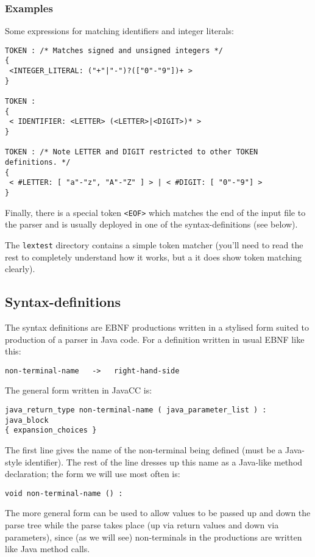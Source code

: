 \documentclass{article}
\begin{document}
\subsubsection*{Examples}

Some expressions for matching identifiers and integer literals:
\begin{verbatim}
TOKEN : /* Matches signed and unsigned integers */
{
 <INTEGER_LITERAL: ("+"|"-")?(["0"-"9"])+ > 
}

TOKEN : 
{ 
 < IDENTIFIER: <LETTER> (<LETTER>|<DIGIT>)* >
}

TOKEN : /* Note LETTER and DIGIT restricted to other TOKEN definitions. */
{
 < #LETTER: [ "a"-"z", "A"-"Z" ] > | < #DIGIT: [ "0"-"9"] >
}
\end{verbatim}
Finally, there is a special token \verb+<EOF>+ which matches the end
of the input file to the parser and is usually deployed in one of
the syntax-definitions (see below).

The \verb+lextest+ directory contains a simple token matcher 
(you'll need to read the rest to completely understand how it works, 
but a it does show token matching clearly).


\subsection*{Syntax-definitions}

The syntax definitions are EBNF productions written in a stylised
form suited to production of a parser in Java code. 
For a definition written in usual EBNF like this:
\begin{verbatim}
non-terminal-name   ->   right-hand-side
\end{verbatim}
The general form written in JavaCC is:
\begin{verbatim}
java_return_type non-terminal-name ( java_parameter_list ) :
java_block
{ expansion_choices }
\end{verbatim}
The first line gives the name of the non-terminal being
defined (must be a Java-style identifier). The rest of
the line dresses up this name as a Java-like method declaration;
the form we will use most often is:
\begin{verbatim}
void non-terminal-name () :
\end{verbatim}
The more general form can be used to allow values to be passed up and
down the parse tree while the parse takes place (up via return values 
and down via parameters), since (as we will see) non-terminals in
the productions are written like Java method calls.
\end{document}
